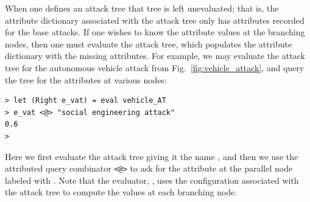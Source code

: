 \documentclass{llncs}
\begin{document}
When one defines an attack tree that tree is left unevaluated; that
is, the attribute dictionary associated with the attack tree only has
attributes recorded for the base attacks.  If one wishes to know the
attribute values at the branching nodes, then one must evaluate the
attack tree, which populates the attribute dictionary with the missing
attributes.  For example, we may evaluate the attack tree for the
autonomous vehicle attack from Fig.~\ref{fig:vehicle_attack}, and
query the tree for the attributes at various nodes:
\begin{mdframed}
\scriptsize
\begin{verbatim}
> let (Right e_vat) = eval vehicle_AT
> e_vat <@> "social engineering attack"
0.6
> 
\end{verbatim}  
\end{mdframed}
Here we first evaluate the attack tree  giving it the
name , and then we use the attributed query combinator
\verb!<@>! to ask for the attribute at the parallel node labeled with
. Note that the evaluator, ,
uses the configuration associated with the attack tree to compute the
values at each branching node.
\end{document}
